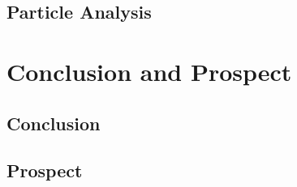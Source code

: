 \documentclass[a4paper, 12pt]{article}
\begin{document}
\subsection{Particle Analysis}\label{sec:particle_analysis}

\newpage
\section{Conclusion and Prospect}

\subsection{Conclusion}

\subsection{Prospect}


\newpage
{}

\end{document}
